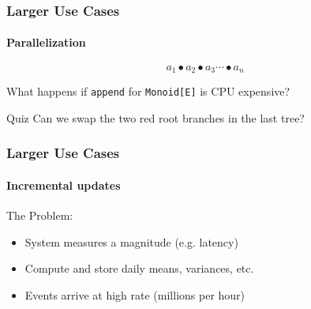 \documentclass{beamer}
\begin{document}
\begin{frame}
  \frametitle{Larger Use Cases}
  \framesubtitle{Parallelization}
  \[a_1 \bullet a_2 \bullet a_3 \dotsb \bullet a_n\]

  What happens if \texttt{append} for \texttt{Monoid[E]} is CPU expensive?

\pause


\begin{block}{Quiz}
  \pause
  Can we swap the two red root branches in the last tree?
\end{block}

\end{frame}

\begin{frame}
  \frametitle{Larger Use Cases}
  \framesubtitle{Incremental updates}
  The Problem:

  \begin{itemize}
    \item System measures a magnitude (e.g. latency)
    \item Compute and store daily means, variances, etc.
    \item Events arrive at high rate (millions per hour)
  \end{itemize}


\end{frame}
\end{document}
